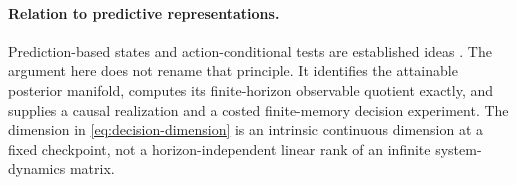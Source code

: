 \paragraph{Relation to predictive representations.}
Prediction-based states and action-conditional tests are established ideas
\cite{LittmanSutton,SinghJamesRudary}. The argument here does not rename that
principle. It identifies the attainable posterior manifold, computes its
finite-horizon observable quotient exactly, and supplies a causal realization
and a costed finite-memory decision experiment. The dimension in
\eqref{eq:decision-dimension} is an intrinsic continuous dimension at a
fixed checkpoint, not a horizon-independent linear rank of an infinite
system-dynamics matrix.
